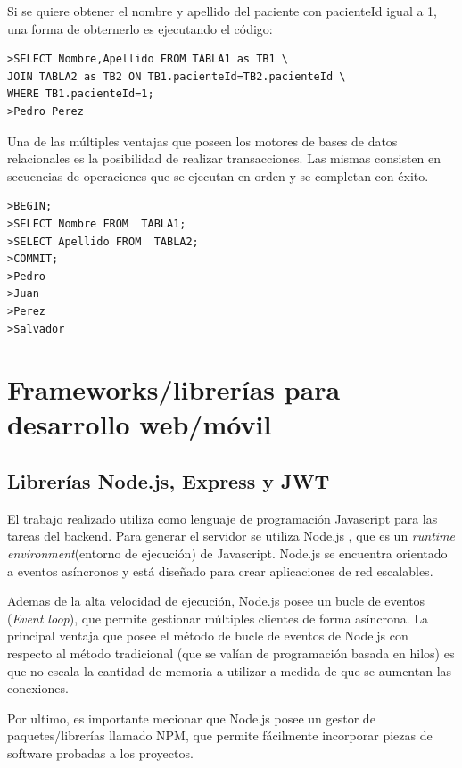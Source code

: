 Si se quiere obtener el nombre y apellido del paciente con pacienteId igual a 1, una forma de obternerlo es ejecutando el código:

\begin{lstlisting}[label=código:SQL:vControl,caption=Ejecución de comando sql]  
>SELECT Nombre,Apellido FROM TABLA1 as TB1 \
JOIN TABLA2 as TB2 ON TB1.pacienteId=TB2.pacienteId \
WHERE TB1.pacienteId=1;
>Pedro Perez
\end{lstlisting}

Una de las múltiples ventajas que poseen los motores de bases de datos relacionales es la posibilidad de realizar transacciones. Las mismas consisten en secuencias de operaciones que se ejecutan en orden y se completan con éxito.

\begin{lstlisting}[label=código:SQL2:vControl,caption=Secuencia de transacción SQL.]  
>BEGIN;
>SELECT Nombre FROM  TABLA1;
>SELECT Apellido FROM  TABLA2;
>COMMIT;
>Pedro 
>Juan
>Perez
>Salvador
\end{lstlisting}


\pagebreak
\section{Frameworks/librerías para desarrollo web/móvil}



\subsection{Librerías Node.js, Express y JWT}
\label{subsec: Node}
El trabajo realizado utiliza como lenguaje de programación  Javascript para las tareas del backend. Para generar el servidor se utiliza Node.js \citep{WEBSITE:20}, que es un \textit{runtime environment}(entorno de ejecución) de Javascript. Node.js se encuentra orientado a eventos asíncronos y está diseñado para crear aplicaciones de red escalables.

Ademas de la alta velocidad de ejecución, Node.js posee un bucle de eventos (\textit{Event loop}), que permite gestionar múltiples clientes de forma asíncrona. La principal ventaja que posee el método de bucle de eventos de Node.js con respecto al método tradicional (que se valían de programación basada en hilos) es que no escala la cantidad de memoria a utilizar a medida de que se aumentan las conexiones.

Por ultimo, es importante mecionar que Node.js posee un gestor de paquetes/librerías llamado NPM, que permite fácilmente incorporar piezas de software probadas a los proyectos.



